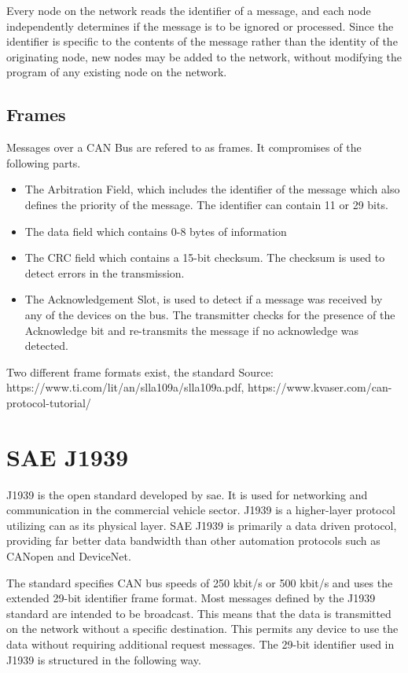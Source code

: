 Every node on the network reads the identifier of a message, and each node independently determines if the message is to be ignored or processed. Since the identifier is specific to the contents of the message rather than the identity of the originating node, new nodes may be added to the network, without modifying the program of any existing node on the network.

\subsection{Frames}
Messages over a CAN Bus are refered to as frames. It compromises of the following parts.

\begin{itemize}
		\item The Arbitration Field, which includes the identifier of the message which also defines the priority of the message. The identifier can contain 11 or 29 bits. 
		\item The data field which contains 0-8 bytes of information
		\item The CRC field which contains a 15-bit checksum. The checksum is used to detect errors in the transmission.
		\item The Acknowledgement Slot, is used to detect if a message was received by any of the devices on the bus. The transmitter checks for the presence of the Acknowledge bit and re-transmits the message if no acknowledge was detected.
		
\end{itemize}

Two different frame formats exist, the standard 
Source: https://www.ti.com/lit/an/slla109a/slla109a.pdf,
https://www.kvaser.com/can-protocol-tutorial/

\section{SAE J1939}
J1939 is the open standard developed by \acrfull{sae}. It is used for networking and communication in the commercial vehicle sector. J1939 is a higher-layer protocol utilizing \acrshort{can} as its physical layer. SAE J1939 is primarily a data driven protocol, providing far better data bandwidth than other automation protocols such as CANopen and DeviceNet. 

The standard specifies CAN bus speeds of 250 kbit/s or 500 kbit/s and uses the extended 29-bit identifier frame format. Most messages defined by the J1939 standard are intended to be broadcast. This means that the data is transmitted on the network without a specific destination. This permits any device to use the data without requiring additional request messages. The 29-bit identifier used in J1939 is structured in the following way.

